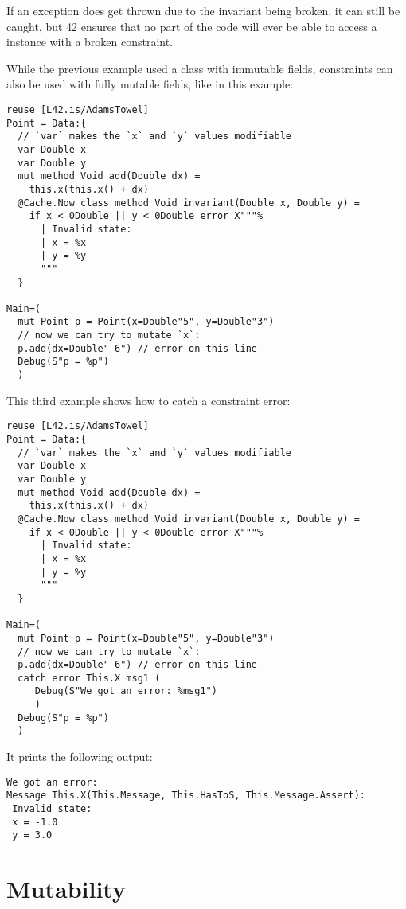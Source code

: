If an exception does get thrown due to the invariant being broken, it can still be caught, but 42 ensures that no part of the code will ever be able to access a  instance with a broken constraint.

While the previous example used a  class with immutable fields, constraints can also be used with fully mutable fields, like in this example:

\begin{lstlisting}[caption=Constraint with mutable fields]
reuse [L42.is/AdamsTowel]
Point = Data:{
  // `var` makes the `x` and `y` values modifiable
  var Double x
  var Double y
  mut method Void add(Double dx) = 
    this.x(this.x() + dx)
  @Cache.Now class method Void invariant(Double x, Double y) = 
    if x < 0Double || y < 0Double error X"""%
      | Invalid state:
      | x = %x
      | y = %y
      """
  }

Main=(
  mut Point p = Point(x=Double"5", y=Double"3")
  // now we can try to mutate `x`:
  p.add(dx=Double"-6") // error on this line
  Debug(S"p = %p")
  )
\end{lstlisting}

This third example shows how to catch a constraint error:

\begin{lstlisting}[caption=Catching a constraint error]
reuse [L42.is/AdamsTowel]
Point = Data:{
  // `var` makes the `x` and `y` values modifiable
  var Double x
  var Double y
  mut method Void add(Double dx) = 
    this.x(this.x() + dx)
  @Cache.Now class method Void invariant(Double x, Double y) = 
    if x < 0Double || y < 0Double error X"""%
      | Invalid state:
      | x = %x
      | y = %y
      """
  }

Main=(
  mut Point p = Point(x=Double"5", y=Double"3")
  // now we can try to mutate `x`:
  p.add(dx=Double"-6") // error on this line
  catch error This.X msg1 (
     Debug(S"We got an error: %msg1")
     )
  Debug(S"p = %p")
  )
\end{lstlisting}

It prints the following output:
\begin{lstlisting}[caption=Constraint error]
We got an error:
Message This.X(This.Message, This.HasToS, This.Message.Assert):
 Invalid state:
 x = -1.0
 y = 3.0

\end{lstlisting}

\section{Mutability}

